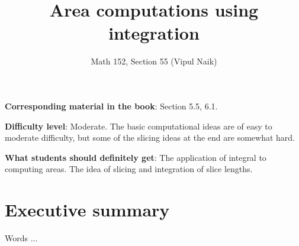 \documentclass[10pt]{amsart}
\title{Area computations using integration}
\author{Math 152, Section 55 (Vipul Naik)}
\begin{document}
\maketitle

{\bf Corresponding material in the book}: Section 5.5, 6.1.

{\bf Difficulty level}: Moderate. The basic computational
ideas are of easy to moderate difficulty, but some of the slicing
ideas at the end are somewhat hard.

{\bf What students should definitely get}: The application of integral
to computing areas. The idea of slicing and integration of slice
lengths.

\section*{Executive summary}

Words ...
\end{document}
